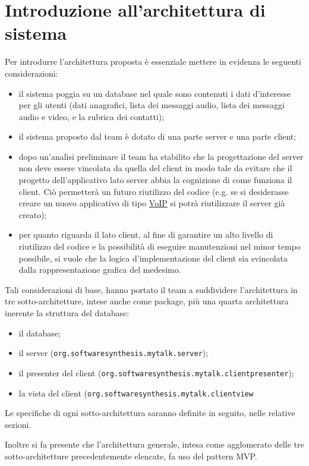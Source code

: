 \section{Introduzione all'architettura di sistema}\label{sec:introdesign}
Per introdurre l'architettura proposta è essenziale mettere in evidenza le seguenti considerazioni:
\begin{itemize}
	\item il sistema poggia su un database nel quale sono contenuti i dati d'interesse per gli utenti (dati anagrafici, lista dei messaggi audio, lista dei messaggi audio e video, e la rubrica dei contatti);
	\item il sistema proposto dal team è dotato di una parte server e una parte client;
	\item dopo un'analisi preliminare il team ha stabilito che la progettazione del server non deve essere vincolata da quella del client in modo tale da evitare che il progetto dell'applicativo lato server abbia la cognizione di come funziona il client. Ciò permetterà un futuro riutilizzo del codice (e.g. se si desiderasse creare un nuovo applicativo di tipo \underline{VoIP} si potrà riutilizzare il server già creato);
	\item per quanto riguarda il lato client, al fine di garantire un alto livello di riutilizzo del codice e la possibilità di eseguire manutenzioni nel minor tempo possibile, si vuole che la logica d'implementazione del client sia svincolata dalla rappresentazione grafica del medesimo.
\end{itemize}

Tali considerazioni di base, hanno portato il team a suddividere l'architettura in tre sotto-architetture, intese anche come package, più una quarta architettura inerente la struttura del database:
\begin{itemize}
	\item il database;
	\item il server (\texttt{org.softwaresynthesis.mytalk.server});
	\item il presenter del client (\texttt{org.softwaresynthesis.mytalk.clientpresenter});
	\item la vista del client (\texttt{org.softwaresynthesis.mytalk.clientview}
\end{itemize}

Le specifiche di ogni sotto-architettura saranno definite in seguito, nelle relative sezioni.

Inoltre si fa presente che l'architettura generale, intesa come agglomerato delle tre sotto-architetture precedentemente elencate, fa uso del pattern MVP\@.

